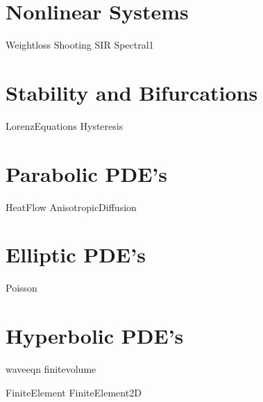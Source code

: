 \documentclass[nociteref]{SIAM-GH-book}
\begin{document}
\part{Nonlinear Systems}
{Weightloss}
{Shooting}
{SIR}
{Spectral1}


\part{Stability and Bifurcations}
{LorenzEquations}
{Hysteresis}


\part{Parabolic PDE's}
{HeatFlow}
{AnisotropicDiffusion}



\part{Elliptic PDE's}
 {Poisson}


\part{Hyperbolic PDE's}
{waveeqn}
{finitevolume}


{FiniteElement}
{FiniteElement2D}

% 
% 
% 
% 
% 
% 
\end{document}
